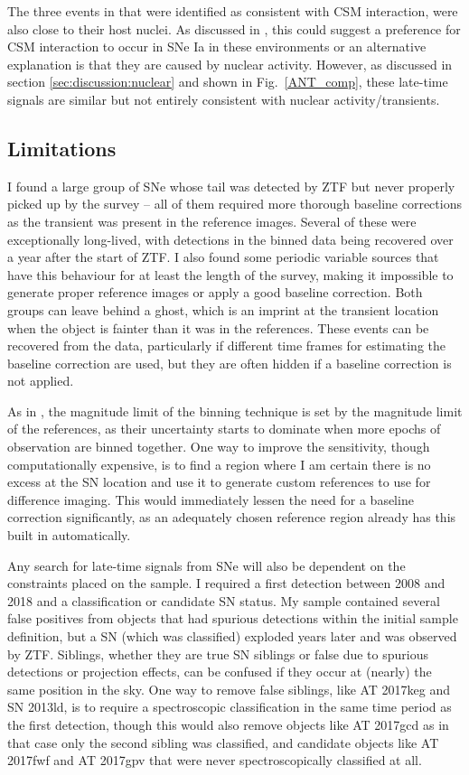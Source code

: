 \documentclass[a4paper,oneside,12pt, class=Latex/Classes/PhDthesisPSnPDF, crop=false]{standalone}
\begin{document}
The three events in \citet{Terwel_2024_paper1} that were identified as consistent with CSM interaction, were also close to their host nuclei. As discussed in \citet{Terwel_2024_paper1}, this could suggest a preference for CSM interaction to occur in SNe Ia in these environments or an alternative explanation is that they are caused by nuclear activity. However, as discussed in section \ref{sec:discussion:nuclear} and shown in Fig.~\ref{ANT_comp}, these late-time signals are similar but not entirely consistent with nuclear activity/transients.


\subsection{Limitations}
\label{sec:discussion:limitations}
I found a large group of SNe whose tail was detected by ZTF but never properly picked up by the survey -- all of them required more thorough baseline corrections as the transient was present in the reference images. Several of these were exceptionally long-lived, with detections in the binned data being recovered over a year after the start of ZTF. I also found some periodic variable sources that have this behaviour for at least the length of the survey, making it impossible to generate proper reference images or apply a good baseline correction. Both groups can leave behind a ghost, which is an imprint at the transient location when the object is fainter than it was in the references. These events can be recovered from the data, particularly if different time frames for estimating the baseline correction are used, but they are often hidden if a baseline correction is not applied.

As in \citet{Terwel_2024_paper1}, the magnitude limit of the binning technique is set by the magnitude limit of the references, as their uncertainty starts to dominate when more epochs of observation are binned together. One way to improve the sensitivity, though computationally expensive, is to find a region where I am certain there is no excess at the SN location and use it to generate custom references to use for difference imaging. This would immediately lessen the need for a baseline correction significantly, as an adequately chosen reference region already has this built in automatically.

Any search for late-time signals from SNe will also be dependent on the constraints placed on the sample. I required a first detection between 2008 and 2018 and a classification or candidate SN status. My sample contained several false positives from objects that had spurious detections within the initial sample definition, but a SN (which was classified) exploded years later and was observed by ZTF. Siblings, whether they are true SN siblings or false due to spurious detections or projection effects, can be confused if they occur at (nearly) the same position in the sky. One way to remove false siblings, like AT 2017keg and SN 2013ld, is to require a spectroscopic classification in the same time period as the first detection, though this would also remove objects like AT 2017gcd as in that case only the second sibling was classified, and candidate objects like AT 2017fwf and AT 2017gpv that were never spectroscopically classified at all.
\end{document}
